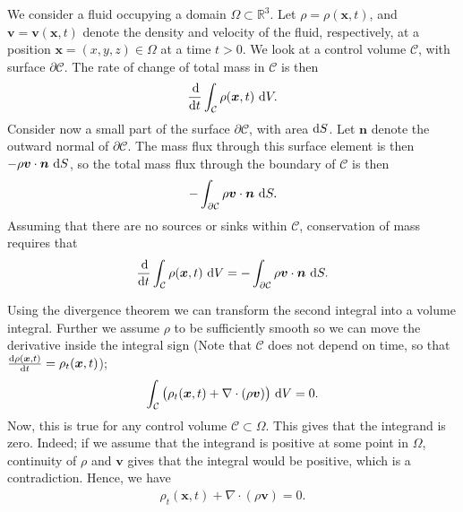 \documentclass[12pt]{article}
\begin{document}
We consider a fluid occupying a domain $\Omega \subset \mathbb{R}^3$. Let $\rho = \rho(\bm{x}, t)$, and
$\bm{v} = \bm{v}(\bm{x},t)$ denote the density and velocity of the fluid, respectively, at a position
$\bm{x} = (x,y,z) \in \Omega$ at a time $t > 0$. We look at a control volume $\mathcal{C}$, with surface $\partial \mathcal{C}$.
The rate of change of total mass in $\mathcal{C}$ is then
\begin{align*}
    \frac{\operatorname{d}\!}{\operatorname{d}\! t}\int_\mathcal{C} \rho(\bm{x},t) \, \operatorname{d}\! V.
\end{align*}
Consider now a small part of the surface $\partial \mathcal{C}$, with area $\operatorname{d}\! S$. Let $\bm{n}$ denote the outward normal
of $\partial \mathcal{C}$. The mass flux through this surface element is then $-\rho \bm{v} \cdot \bm{n} \, \operatorname{d}\! S$, so the
total mass flux through the boundary of $\mathcal{C}$ is then
\begin{align*}
    -\int_{\partial \mathcal{C}}\rho \bm{v} \cdot \bm{n} \, \operatorname{d}\! S.
\end{align*}
Assuming that there are no sources or sinks within $\mathcal{C}$, conservation of mass requires that
\begin{align*}
    \frac{\operatorname{d}\!}{\operatorname{d}\! t}\int_\mathcal{C} \rho(\bm{x},t) \, \operatorname{d}\! V
                            = -\int_{\partial \mathcal{C}}\rho \bm{v} \cdot \bm{n} \, \operatorname{d}\! S.
\end{align*}

Using the divergence theorem we can transform the second integral into
a volume integral. Further we assume $\rho$ to be sufficiently smooth
so we can move the derivative inside the integral sign (Note that
$\mathcal{C}$ does not depend on time, so that $\frac{\operatorname{d}\! \rho(\bm x,t)}{\operatorname{d}\!
  t}= \rho_t(\bm x, t)$);
\begin{align*}
    \int_\mathcal{C} \big(\rho_t(\bm{x},t) + \nabla \cdot (\rho \bm{v}) \big) \, \operatorname{d}\! V = 0.
\end{align*}
Now, this is true for any control volume $\mathcal{C} \subset \Omega$. This gives that the integrand is zero. Indeed;
if we assume that the integrand is positive at some point in $\Omega$, continuity of $\rho$ and $\bm{v}$
gives that the integral would be positive, which is a contradiction. Hence, we have
\begin{align}
    \label{eq:massConservation}
    \rho_t(\bm{x},t) + \nabla \cdot (\rho \bm{v}) = 0.
\end{align}
%
%
\end{document}
